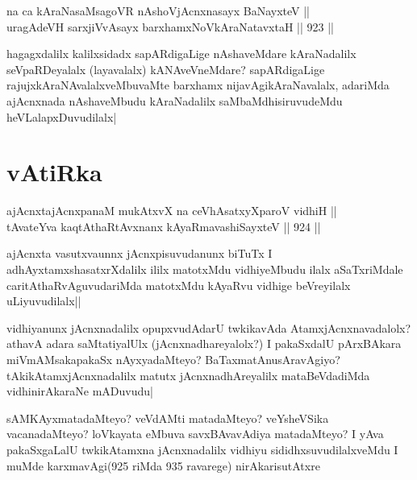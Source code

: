 \begin{shl}
na ca kAraNasaMsagoVR nAshoV\s jAcnxnasayx BaNayxteV || \\
uragAdeVH sarxjiVvAsayx barxhamxNoV\s kAraNatavxtaH ||  923 ||  
\end{shl}

\begin{artha}
hagagxdalilx kalilxsidadx sapARdigaLige nAshaveMdare kAraNadalilx seVpaRDeyalalx (layavalalx) kANAveVneMdare? sapARdigaLige rajujxkAraNAvalalxveMbuvaMte barxhamx nijavAgikAraNavalalx, adariMda ajAcnxnada nAshaveMbudu kAraNadalilx saMbaMdhisiruvudeMdu heVLalapxDuvudilalx|
\end{artha}

\section*{vAtiRka}


\begin{shl}
ajAcnxtajAcnxpanaM mukAtxvX na ceVhAsatxyXparoV vidhiH || \\
tAvateYva kaqtAthaRtAvxnanx kAyaRmavashiSayxteV ||  924 ||  
\end{shl}

\begin{artha}
ajAcnxta vasutxvaunnx jAcnxpisuvudanunx biTuTx I adhAyxtamxshasatxrXdalilx ililx matotxMdu vidhiyeMbudu ilalx aSaTxriMdale caritAthaRvAguvudariMda matotxMdu kAyaRvu vidhige beVreyilalx uLiyuvudilalx||
\end{artha}

\begin{artha}
vidhiyanunx jAcnxnadalilx opupxvudAdarU twkikavAda AtamxjAcnxnavadalolx? athavA adara saMtatiyalUlx (jAcnxnadhareyalolx?) I pakaSxdalU pArxBAkara miVmAMsakapakaSx nAyxyadaMteyo? BaTaxmatAnusAravAgiyo?tAkikAtamxjAcnxnadalilx matutx jAcnxnadhAreyalilx mataBeVdadiMda vidhinirAkaraNe mADuvudu|
\end{artha}

\begin{artha}
sAMKAyxmatadaMteyo? veVdAMti matadaMteyo? veYsheVSika vacanadaMteyo? loVkayata eMbuva savxBAvavAdiya matadaMteyo? I yAva pakaSxgaLalU twkikAtamxna jAcnxnadalilx vidhiyu sididhxsuvudilalxveMdu I muMde karxmavAgi(925 riMda 935 ravarege) nirAkarisutAtxre
\end{artha}



